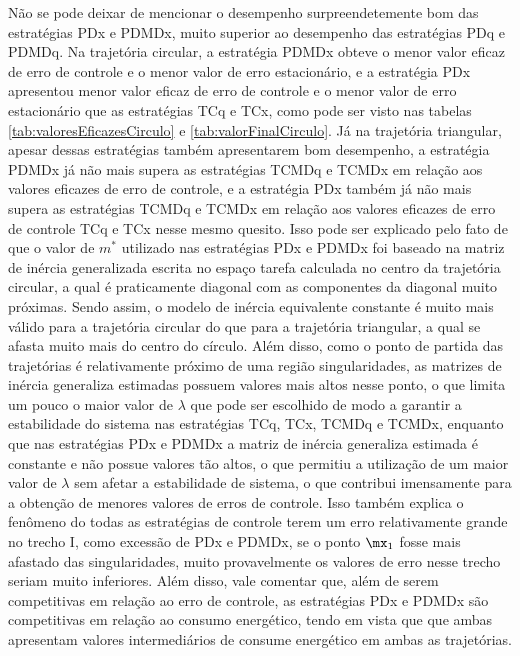 \documentclass[]{politex}
\begin{document}
Não se pode deixar de mencionar o desempenho surpreendetemente bom das estratégias PDx e PDMDx, muito superior ao desempenho das estratégias PDq e PDMDq. Na trajetória circular, a estratégia PDMDx obteve o menor valor eficaz de erro de controle e o menor valor de erro estacionário, e a estratégia PDx apresentou menor valor eficaz de erro de controle e o menor valor de erro estacionário que as estratégias TCq e TCx, como pode ser visto nas tabelas \ref{tab:valoresEficazesCirculo} e \ref{tab:valorFinalCirculo}. Já na trajetória triangular, apesar dessas estratégias também apresentarem bom desempenho, a estratégia PDMDx já não mais supera as estratégias TCMDq e TCMDx em relação aos valores eficazes de erro de controle, e a estratégia PDx também já não mais supera as estratégias TCMDq e TCMDx em relação aos valores eficazes de erro de controle TCq e TCx nesse mesmo quesito. Isso pode ser explicado pelo fato de que o valor de $m^*$ utilizado nas estratégias PDx e PDMDx foi baseado na matriz de inércia generalizada escrita no espaço tarefa calculada no centro da trajetória circular, a qual é praticamente diagonal com as componentes da diagonal muito próximas. Sendo assim, o modelo de inércia equivalente constante é muito mais válido para a trajetória circular do que para a trajetória triangular, a qual se afasta muito mais do centro do círculo. Além disso, como o ponto de partida das trajetórias é relativamente próximo de uma região singularidades, as matrizes de inércia generaliza estimadas possuem valores mais altos nesse ponto, o que limita um pouco o maior valor de $\lambda$ que pode ser escolhido de modo a garantir a estabilidade do sistema nas estratégias TCq, TCx, TCMDq e TCMDx, enquanto que nas estratégias PDx e PDMDx a matriz de inércia generaliza estimada é constante e não possue valores tão altos, o que permitiu a utilização de um maior valor de $\lambda$ sem afetar a estabilidade de sistema, o que contribui imensamente para a obtenção de menores valores de erros de controle. Isso também explica o fenômeno do todas as estratégias de controle terem um erro relativamente grande no trecho I, como excessão de PDx e PDMDx, se o ponto $\mx_1$ fosse mais afastado das singularidades, muito provavelmente os valores de erro nesse trecho seriam muito inferiores. Além disso, vale comentar que, além de serem competitivas em relação ao erro de controle, as estratégias PDx e PDMDx são competitivas em relação ao consumo energético, tendo em vista que que ambas apresentam valores intermediários de consume energético em ambas as trajetórias.
\end{document}

